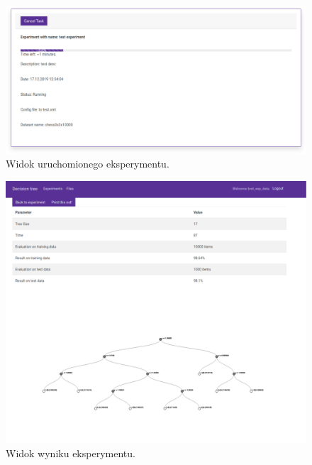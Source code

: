 \begin{figure}[htb]
	\centering
	\includegraphics[width=15cm]{grafika/progress_bar.eps}
	\caption{Widok uruchomionego eksperymentu.}
	\label{rys15_progress_bar}
\end{figure}

\begin{figure}[htb]
	\centering
	\includegraphics[width=15cm]{grafika/tree_veiw.eps}
	\caption{Widok wyniku eksperymentu.}
	\label{rys16_tree_veiw}
\end{figure}

